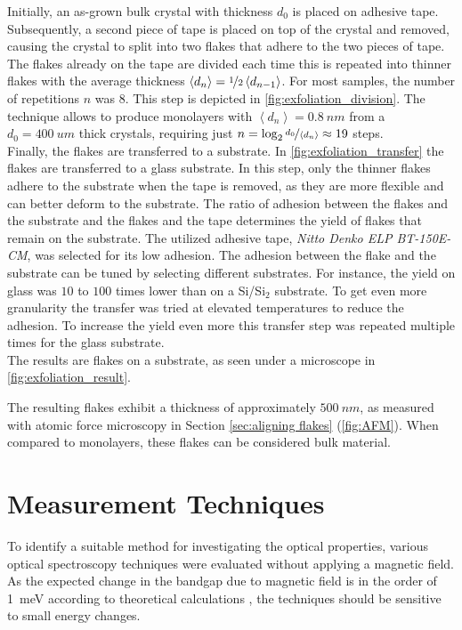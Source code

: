 \documentclass[
	twoside,
	parskip=half,
	a4paper,
]{scrbook}
\begin{document}
Initially, an as-grown bulk crystal with thickness $d_0$ is placed on adhesive tape.
Subsequently, a second piece of tape is placed on top of the crystal and removed, causing the crystal to split into two flakes that adhere to the two pieces of tape.
The flakes already on the tape are divided each time this is repeated into thinner flakes with the average thickness $\left< d_{n} \right> = \nicefrac{1}{2} \left< d_{n-1} \right>$.
For most samples, the number of repetitions $n$ was $8$.
This step is depicted in \autoref{fig:exfoliation_division}.
The technique allows to produce monolayers with $ \left<d_n\right>  = \SI{0.8}{nm}$ \cite{NiPS3_few_layer} from a $d_0 = \SI{400}{um}$ thick crystals, requiring just $n = \log_2 \nicefrac{d_0}{\left<d_n\right>} \approx 19$ steps.\\
Finally, the flakes are transferred to a substrate.
In \autoref{fig:exfoliation_transfer} the flakes are transferred to a glass substrate.
In this step, only the thinner flakes adhere to the substrate when the tape is removed, as they are more flexible and can better deform to the substrate.
The ratio of adhesion between the flakes and the substrate and the flakes and the tape determines the yield of flakes that remain on the substrate.
The utilized adhesive tape, \textit{Nitto Denko ELP BT-150E-CM}, was selected for its low adhesion.
The adhesion between the flake and the substrate can be tuned by selecting different substrates.
For instance, the yield on glass was $10$ to $100$ times lower than on a Si/Si$_2$ substrate.
To get even more granularity the transfer was tried at elevated temperatures to reduce the adhesion.
To increase the yield even more this transfer step was repeated multiple times for the glass substrate.\\
The results are flakes on a substrate, as seen under a microscope in \autoref{fig:exfoliation_result}.

The resulting flakes exhibit a thickness of approximately $\SI{500}{nm}$, as measured with atomic force microscopy in Section \ref{sec:aligning flakes} (\autoref{fig:AFM}).
When compared to monolayers, these flakes can be considered bulk material.


\section{Measurement Techniques}
To identify a suitable method for investigating the optical properties, various optical spectroscopy techniques were evaluated without applying a magnetic field. \\
As the expected change in the bandgap due to magnetic field is in the order of \SI{1}{meV} according to theoretical calculations \cite{MPX_first_principles}, the techniques should be sensitive to small energy changes.
\end{document}
